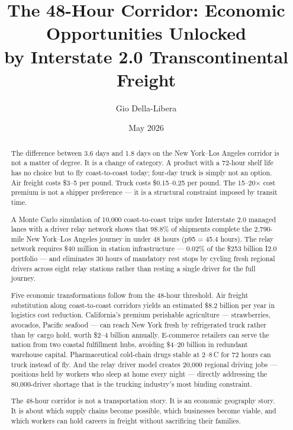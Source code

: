 \documentclass[12pt]{article}
\title{The 48-Hour Corridor: Economic Opportunities Unlocked\\
       by Interstate 2.0 Transcontinental Freight}
\author{Gio Della-Libera}
\date{May 2026}
\begin{document}
\maketitle

\begin{abstract}
The difference between 3.6 days and 1.8 days on the New York--Los Angeles corridor is not
a matter of degree. It is a change of category. A product with a 72-hour shelf life has no
choice but to fly coast-to-coast today; four-day truck is simply not an option. Air freight
costs \$3--5 per pound. Truck costs \$0.15--0.25 per pound. The 15--20$\times$ cost premium
is not a shipper preference --- it is a structural constraint imposed by transit time.

A Monte Carlo simulation of 10,000 coast-to-coast trips under Interstate 2.0 managed lanes
with a driver relay network shows that 98.8\% of shipments complete the 2,790-mile
New York--Los Angeles journey in under 48 hours (p95 = 45.4 hours). The relay network
requires \$40 million in station infrastructure --- 0.02\% of the \$253 billion I2.0
portfolio --- and eliminates 30 hours of mandatory rest stops by cycling fresh regional
drivers across eight relay stations rather than resting a single driver for the full journey.

Five economic transformations follow from the 48-hour threshold. Air freight substitution
along coast-to-coast corridors yields an estimated \$8.2 billion per year in logistics cost
reduction. California's premium perishable agriculture --- strawberries, avocados, Pacific
seafood --- can reach New York fresh by refrigerated truck rather than by cargo hold,
worth \$2--4 billion annually. E-commerce retailers can serve the nation from two coastal
fulfillment hubs, avoiding \$4--20 billion in redundant warehouse capital. Pharmaceutical
cold-chain drugs stable at 2--8\,\textdegree C for 72 hours can truck instead of fly.
And the relay driver model creates 20,000 regional driving jobs --- positions held by
workers who sleep at home every night --- directly addressing the 80,000-driver shortage
that is the trucking industry's most binding constraint.

The 48-hour corridor is not a transportation story. It is an economic geography story.
It is about which supply chains become possible, which businesses become viable, and which
workers can hold careers in freight without sacrificing their families.
\end{abstract}












\end{document}

